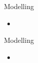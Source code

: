 
\begin{frame}{Modelling}{}
	\begin{itemize}
		\item 
	\end{itemize}
\end{frame}




\begin{frame}{Modelling}{}
	\begin{itemize}
		\item 
	\end{itemize}
\end{frame}


